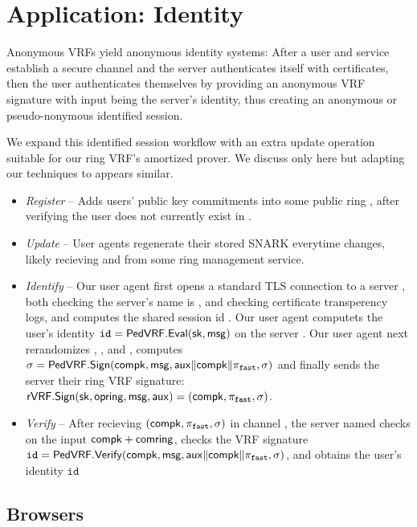 \section{Application: Identity}
\label{sec:app_identity}

Anonymous VRFs yield anonymous identity systems:
After a user and service establish a secure channel and
the server authenticates itself with certificates, then
the user authenticates themselves by providing an anonymous
VRF signature with input \msg being the server's identity,
thus creating an anonymous or pseudo-nonymous identified session.

We expand this identified session workflow with an extra
update operation suitable for our ring VRF's amortized prover.
We discuss only \pifast here but adapting our techniques to \pisafe appears similar. 

\begin{itemize}
\item {\em Register} --
 Adds users' public key commitments into some public ring \ctx,
 after verifying the user does not currently exist in \ctx.
\item {\em Update} --
 User agents regenerate their stored SNARK \pifast everytime \ctx changes,
 likely recieving \comring and \openring from some ring management service.
\item {\em Identify} --
 Our user agent first opens a standard TLS connection to a server \msg,
 both checking the server's name is \msg, and checking certificate
 transperency logs, and computes the shared session id \aux.
 Our user agent computets the user's identity
  $\mathtt{id} = {\mathsf{PedVRF}}.{\mathsf{Eval}}(\mathsf{sk},\mathsf{msg})$ on the server \msg.
 Our user agent next rerandomizes \pifast, \compk, and \openpk, computes
 $\sigma = {\mathsf{PedVRF}}.{\mathsf{Sign}}(\mathsf{compk},\mathsf{msg},\mathsf{aux} \| \mathsf{compk} \| \pi_{\mathtt{fast}},\sigma)$
 and finally sends the server their ring VRF signature:
 ${\mathsf{rVRF}}.{\mathsf{Sign}}(\mathsf{sk},\mathsf{opring},\mathsf{msg},\mathsf{aux}) = (\mathsf{compk},\pi_{\mathtt{fast}},\sigma)$.
\item {\em Verify} -- 
 After recieving $(\mathsf{compk},\pi_{\mathtt{fast}},\sigma)$ in channel \aux,
 the server named \msg checks \pifast on the input $\mathsf{compk} + \mathsf{comring}$,
 checks the VRF signature
 $\mathtt{id} = {\mathsf{PedVRF}}.{\mathsf{Verify}}(\mathsf{compk},\mathsf{msg},\mathsf{aux} \| \mathsf{compk} \| \pi_{\mathtt{fast}},\sigma)$,
 and obtains the user's identity $\mathtt{id}$
\end{itemize}


\subsection{Browsers}

